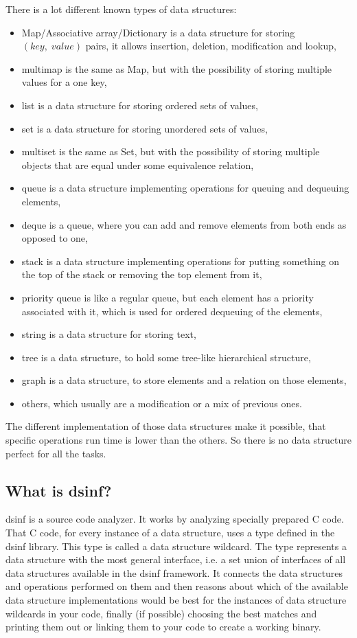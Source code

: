 \documentclass[a4paper,11pt]{article}
\begin{document}
	There is a lot different known types of data structures:
	\begin{itemize}
		\item Map/Associative array/Dictionary is a data structure for storing $(key,\;value)$ pairs, it allows
			insertion, deletion, modification and lookup,
		\item multimap is the same as Map, but with the possibility of storing multiple values for a one key,
		\item list is a data structure for storing ordered sets of values,
		\item set is a data structure for storing unordered sets of values,
		\item multiset is the same as Set, but with the possibility of storing multiple objects that are equal
			under some equivalence relation,
		\item queue is a data structure implementing operations for queuing and dequeuing elements,
		\item deque is a queue, where you can add and remove elements from both ends as opposed to one,
		\item stack is a data structure implementing operations for putting something on the top of the stack or
			removing the top element from it,
		\item priority queue is like a regular queue, but each element has a priority associated with it, which
			is used for ordered dequeuing of the elements,
		\item string is a data structure for storing text,
		\item tree is a data structure, to hold some tree-like hierarchical structure,
		\item graph is a data structure, to store elements and a relation on those elements,
		\item others, which usually are a modification or a mix of previous ones.
	\end{itemize}

	The different implementation of those data structures make it possible, that specific operations run time is
	lower than the others. So there is no data structure perfect for all the tasks.

	\subsection{What is dsinf?} \label{sub:intro}

		dsinf is a source code analyzer. It works by analyzing specially prepared C code. That C code, for every
		instance of a data structure, uses a type defined in the dsinf library. This type is called a data
		structure wildcard. The type represents a data structure with the most general interface, i.e. a set union
		of interfaces of all data structures available in the dsinf framework. It connects the data structures
		and operations performed on them and then reasons about which of the available data structure
		implementations would be best for the instances of data structure wildcards in your code, finally (if
		possible) choosing the best matches and printing them out or linking them to your code to create a
		working binary.
\end{document}
